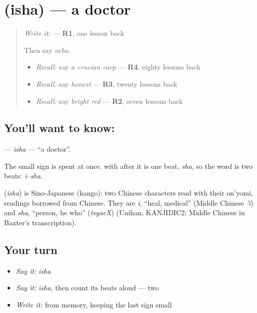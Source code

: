 \section[\texorpdfstring{\ja{いしゃ} (isha)}{いしゃ (isha)}]{ (isha) — a doctor}

\label{lesson:JA-C131-isha}



\begin{quote}
\emph{Write it:} \textbf{} — \textbf{R1}, one lesson back

Then say \emph{ocha}.

\begin{itemize}
\raggedright
  \item \emph{Recall:} say \emph{a crucian carp} — \textbf{R4}, eighty lessons back
  \item \emph{Recall:} say \emph{honest} — \textbf{R3}, twenty lessons back
  \item \emph{Recall:} say \emph{bright red} — \textbf{R2}, seven lessons back
\end{itemize}
\end{quote}

\subsection*{You'll want to know: }
\textbf{} — \emph{isha} — \textquotedblleft{}a doctor\textquotedblright{}.

The small sign is spent at once. \textbf{} with \textbf{} after it is one beat, \emph{sha}, so the word is two beats: \emph{i–sha}.

\begin{cousinweb}
\textbf{} (\emph{isha}) is Sino-Japanese (kango): two Chinese characters read with their on'yomi, readings borrowed from Chinese. They are \emph{i}, \textquotedblleft{}heal, medical\textquotedblright{} (Middle Chinese \emph{'i}) and \emph{sha}, \textquotedblleft{}person, he who\textquotedblright{} (\emph{tsyaeX}) (Unihan, KANJIDIC2; Middle Chinese in Baxter's transcription).
\end{cousinweb}

\subsection*{Your turn}
\begin{itemize}
\raggedright
  \item \emph{Say it:} \emph{isha}
  \item \emph{Say it:} \emph{isha}, then count its beats aloud — two
  \item \emph{Write it:} \textbf{} from memory, keeping the last sign small
\end{itemize}

